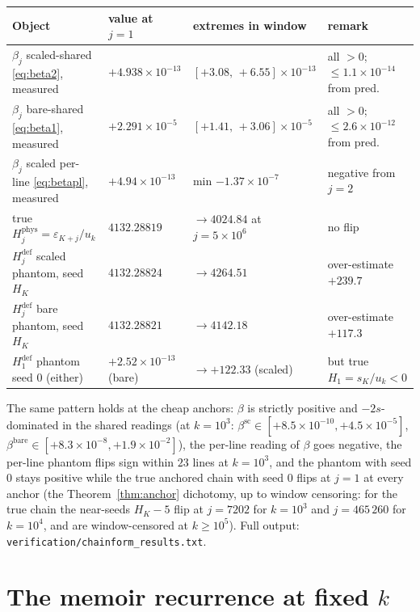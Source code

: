 \documentclass[11pt]{article}
\theoremstyle{remark}
\newcommand{\uk}{u_k}
\newcommand{\eps}{\varepsilon}
\begin{document}
\begin{center}
\begin{tabular}{@{}llll@{}}
\toprule
Object & value at $j=1$ & extremes in window & remark\\
\midrule
$\beta_j$ scaled-shared \eqref{eq:beta2}, measured & $+4.938\times10^{-13}$ & $[+3.08,\,+6.55]\times10^{-13}$ & all $>0$; $\le1.1\times10^{-14}$ from pred.\\
$\beta_j$ bare-shared \eqref{eq:beta1}, measured & $+2.291\times10^{-5}$ & $[+1.41,\,+3.06]\times10^{-5}$ & all $>0$; $\le2.6\times10^{-12}$ from pred.\\
$\beta_j$ scaled per-line \eqref{eq:betapl}, measured & $+4.94\times10^{-13}$ & min $-1.37\times10^{-7}$ & negative from $j=2$\\
 true $H^{\mathrm{phys}}_j=\eps_{K+j}/\uk$ & $4132.28819$ & $\to4024.84$ at $j=5\times10^6$ & no flip\\
$H^{\mathrm{def}}_j$ scaled phantom, seed $H_K$ & $4132.28824$ & $\to4264.51$ & over-estimate $+239.7$\\
$H^{\mathrm{def}}_j$ bare phantom, seed $H_K$ & $4132.28821$ & $\to4142.18$ & over-estimate $+117.3$\\
$H^{\mathrm{def}}_1$ phantom seed $0$ (either) & $+2.52\times10^{-13}$ (bare) & $\to+122.33$ (scaled) & but true $H_1=s_K/\uk<0$\\
\bottomrule
\end{tabular}
\end{center}

\noindent
The same pattern holds at the cheap anchors: $\beta$ is strictly positive
and $-2s$-dominated in the shared readings (at $k=10^3$:
$\beta^{\mathrm{sc}}\in[+8.5\times10^{-10},+4.5\times10^{-5}]$,
$\beta^{\mathrm{bare}}\in[+8.3\times10^{-8},+1.9\times10^{-2}]$), the
per-line reading of $\beta$ goes negative, the per-line phantom flips sign
within $23$ lines at $k=10^3$, and the phantom with seed $0$ stays positive
while the true anchored chain with seed $0$ flips at $j=1$ at every anchor
(the Theorem~\ref{thm:anchor} dichotomy, up to window censoring: for the
true chain the near-seeds $H_K-5$ flip at $j=7202$ for $k=10^3$ and
$j=465\,260$ for $k=10^4$, and are window-censored at $k\ge10^5$). Full
output: \texttt{verification/chainform\_results.txt}.

\section{The memoir recurrence at fixed $k$}\label{sec:approachA}
\end{document}
